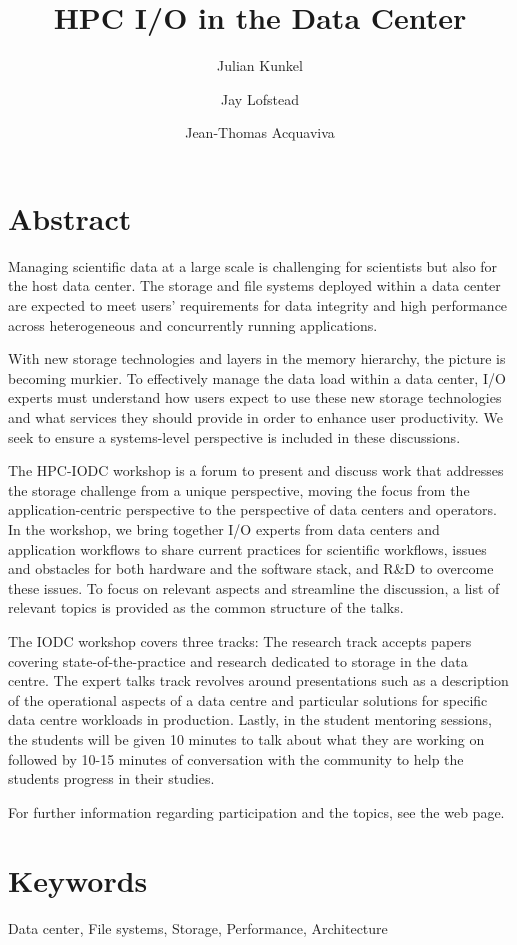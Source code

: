 \documentclass[a4paper,10pt]{article}
\title{HPC I/O in the Data Center}
\author{Julian Kunkel \and Jay Lofstead \and Jean-Thomas Acquaviva}
\begin{document}
\maketitle


\section{Abstract}
Managing scientific data at a large scale is challenging for scientists but also for the host data center.
The storage and file systems deployed within a data center are expected to meet users' requirements for data integrity and high performance across heterogeneous and concurrently running applications.

With new storage technologies and layers in the memory hierarchy, the picture is becoming murkier.
To effectively manage the data load within a data center, I/O experts must understand how users expect to use these new storage technologies and what services they should provide in order to enhance user productivity. We seek to ensure a systems-level perspective is included in these discussions.

The HPC-IODC workshop is a forum to present and discuss work that addresses the storage challenge from a unique perspective, moving the focus from the application-centric perspective to the perspective of data centers and operators.
In the workshop, we bring together I/O experts from data centers and application workflows to share current practices for scientific workflows, issues and obstacles for both hardware and the software stack, and R\&D to overcome these issues.
To focus on relevant aspects and streamline the discussion, a list of relevant topics is provided as the common structure of the talks.

The IODC workshop covers three tracks:
The research track accepts papers covering state-of-the-practice and research dedicated to storage in the data centre.
The expert talks track revolves around presentations such as a description of the operational aspects of a data centre and 
particular solutions for specific data centre workloads in production.
Lastly, in the student mentoring sessions, the students will be given 10 minutes to talk about what they are working on followed by 10-15 minutes of conversation with the community to help the students progress in their studies.

For further information regarding participation and the topics, see the web page.

\section{Keywords}
Data center, File systems, Storage, Performance, Architecture
\end{document}
